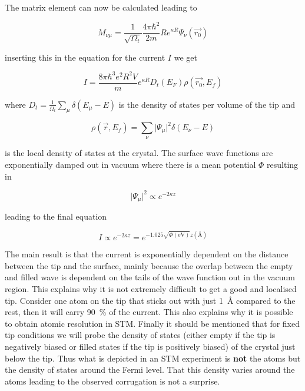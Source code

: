 \vspace{1cm}

The matrix element can now be calculated leading to

\begin{equation}
M_{\nu\mu}=\frac{1}{\sqrt{\Omega_t}}\frac{4\pi\hbar^2}{2m}Re^{\kappa R}\Psi_{\nu}(\vec{r_0})
\end{equation}

\noindent inserting this in the equation for the current $I$ we get

\begin{equation}
I=\frac{8\pi\hbar^3e^2R^2V}{m}e^{\kappa R}D_t(E_F)\rho(\vec{r_0},E_f)
\end{equation}

\noindent where $D_t=\frac{1}{\Omega_t}\sum_{\mu}\delta(E_{\mu}-E)$ is the density of states per volume of the tip and

\begin{equation}
\rho(\vec{r},E_f)=\sum_{\nu}\vert\Psi_{\mu} \vert^2\delta(E_{\nu}-E)
\end{equation}

\noindent is the local density of states at the crystal. The surface wave functions are exponentially damped out in vacuum where there is a mean potential $\Phi$ resulting in

\begin{equation}
 \vert\Psi_{\mu}\vert^2\propto e^{-2\kappa z}
\end{equation}

\noindent leading to the final equation

\begin{equation}
I\propto e^{-2\kappa z}=e^{-1.025\sqrt{\Phi(\si{\electronvolt})}z(\si{\angstrom})}
\end{equation}

The main result is that the current is exponentially dependent on the distance between the tip and the surface, mainly because the overlap between the empty and filled wave is dependent on the tails of the wave function out in the vacuum region. This explains why it is not extremely difficult to get a good and localised tip. Consider one atom on the tip that sticks out with just \SI{1}{\angstrom} compared to the rest, then it will carry \SI{90}{\percent} of the current. This also explains why it is possible to obtain atomic resolution in STM. Finally it should be mentioned that for  fixed tip conditions we will probe the density of states (either empty if the tip is negatively biased or filled states if the tip is positively biased) of the crystal just below the tip. Thus what is depicted in an STM experiment is {\bf not} the atoms but the density of states around the Fermi level. That this density varies around the atoms leading to the observed corrugation is not a surprise.

